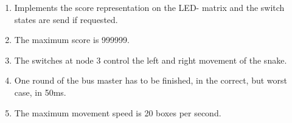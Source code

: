 \begin{enumerate}
\item {}  Implements the score representation on the LED- matrix 
and the switch states are send if requested.
\item {}  The maximum score is 999999.
\item {}  The switches at node 3 control the left and right
movement of the snake.
\item {}  One round of the bus master has to be
finished, in the correct, but worst case, in 50ms. 
\item {}  The maximum movement speed is 20 boxes per second.
\end{enumerate}
